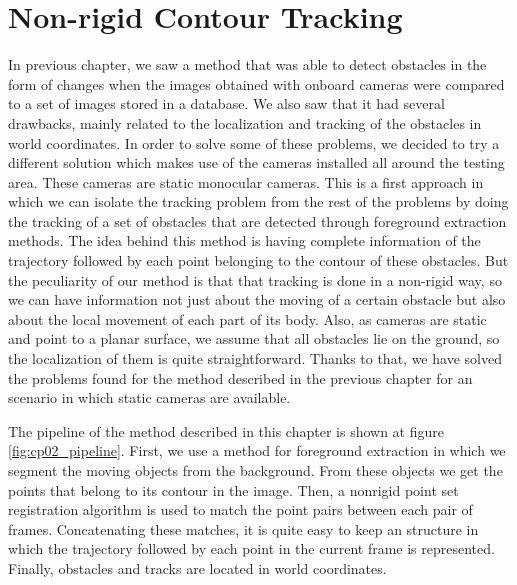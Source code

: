 
\graphicspath{{./images/chapter02/bmps/}{./images/chapter02/vects/}{./images/chapter02/}}

\chapter{Non-rigid Contour Tracking}\label{ch:chapter02}

In previous chapter, we saw a method that was able to detect obstacles in the form of changes when the images obtained with onboard cameras were compared to a set of images stored in a database. We also saw that it had several drawbacks, mainly related to the localization and tracking of the obstacles in world coordinates. In order to solve some of these problems, we decided to try a different solution which makes use of the cameras installed all around the testing area. These cameras are static monocular cameras. This is a first approach in which we can isolate the tracking problem from the rest of the problems by doing the tracking of a set of obstacles that are detected through foreground extraction methods.
The idea behind this method is having complete information of the trajectory followed by each point belonging to the contour of these obstacles. But the peculiarity of our method is that that tracking is done in a non-rigid way, so we can have information not just about the moving of a certain obstacle but also about the local movement of each part of its body.
Also, as cameras are static and point to a planar surface, we assume that all obstacles lie on the ground, so the localization of them is quite straightforward. Thanks to that, we have solved the problems found for the method described in the previous chapter for an scenario in which static cameras are available. 

The pipeline of the method described in this chapter is shown at figure \ref{fig:cp02_pipeline}. First, we use a method for foreground extraction in which we segment the moving objects from the background. From these objects we get the points that belong to its contour in the image. Then, a nonrigid point set registration algorithm is used to match the point pairs between each pair of frames. Concatenating these matches, it is quite easy to keep an structure in which the trajectory followed by each point in the current frame is represented. Finally, obstacles and tracks are located in world coordinates.


